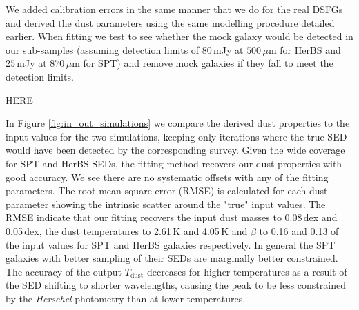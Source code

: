 We added calibration errors in the same manner that we do for the real DSFGs and derived the dust oarameters using the same modelling procedure detailed earlier. When fitting we test to see whether the mock galaxy would be detected in our sub-samples (assuming detection limits of $80\,$mJy at $500\,\mu$m for HerBS and $25\,$mJy at $870\,\mu$m for SPT) and remove mock galaxies if they fall to meet the detection limits.

{\color{red}HERE}

In Figure \ref{fig:in_out_simulations} we compare the derived dust properties to the input values for the two simulations, keeping only iterations where the true SED would have been detected by the corresponding survey. Given the wide coverage for SPT and HerBS SEDs, the fitting method recovers our dust properties with good accuracy. We see there are no systematic offsets with any of the fitting parameters. The root mean square error (RMSE) is calculated for each dust parameter showing the intrinsic scatter around the "true" input values. The RMSE indicate that our fitting recovers the input dust masses to {\color{red} 0.08}\,dex and {\color{red}0.05}\,dex, the dust temperatures to {\color{red} 2.61}\,K and {\color{red} 4.05}\,K and $\beta$ to {\color{red} 0.16} and {\color{red} 0.13} of the input values for SPT and HerBS galaxies respectively. In general the SPT galaxies with better sampling of their SEDs are marginally better constrained. The accuracy of the output $T_{\textrm{dust}}$ decreases for higher temperatures as a result of the SED shifting to shorter wavelengths, causing the peak to be less constrained by the \textit{Herschel} photometry than at lower temperatures.


